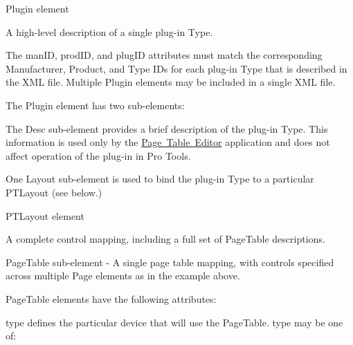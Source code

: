 \begin{DoxyItemize}
\item {\ttfamily Plugin} element 

A high-\/level description of a single plug-\/in Type.

The {\ttfamily man\+ID}, {\ttfamily prod\+ID}, and {\ttfamily plug\+ID} attributes must match the corresponding Manufacturer, Product, and Type I\+Ds for each plug-\/in Type that is described in the X\+ML file. Multiple {\ttfamily Plugin} elements may be included in a single X\+ML file.

The {\ttfamily Plugin} element has two sub-\/elements\+:


\begin{DoxyEnumerate}
\item The {\ttfamily Desc} sub-\/element provides a brief description of the plug-\/in Type. This information is used only by the \mbox{\hyperlink{a00833_subsection_creating_page_tables_in_pete}{Page Table Editor}} application and does not affect operation of the plug-\/in in Pro Tools.  
\item One {\ttfamily Layout} sub-\/element is used to bind the plug-\/in Type to a particular {\ttfamily P\+T\+Layout} (see below.)  
\end{DoxyEnumerate}


\item {\ttfamily P\+T\+Layout} element 

A complete control mapping, including a full set of {\ttfamily Page\+Table} descriptions.


\begin{DoxyItemize}
\item {\ttfamily Page\+Table} sub-\/element -\/ A single page table mapping, with controls specified across multiple {\ttfamily Page} elements as in the example above.

{\ttfamily Page\+Table} elements have the following attributes\+:


\begin{DoxyEnumerate}
\item {\ttfamily type} defines the particular device that will use the {\ttfamily Page\+Table}. {\ttfamily type} may be one of\+:



\end{DoxyEnumerate}
\end{DoxyItemize}
\end{DoxyItemize}
